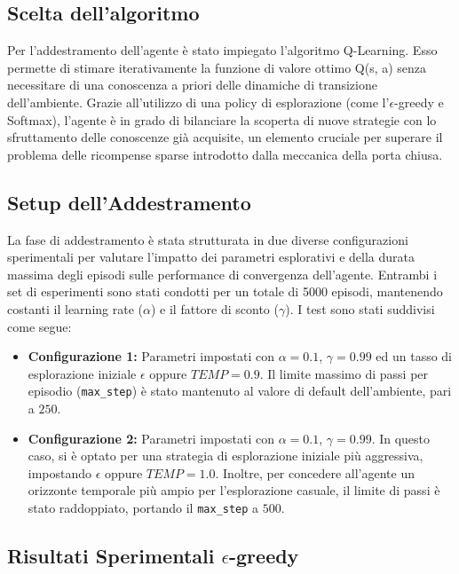\documentclass[12pt,a4paper]{article}
\begin{document}
\subsection{Scelta dell'algoritmo}
Per l’addestramento dell’agente è stato impiegato l’algoritmo Q-Learning. Esso permette di stimare iterativamente la funzione di valore ottimo Q(s, a) senza necessitare di una conoscenza a priori delle dinamiche di transizione dell’ambiente. Grazie all’utilizzo di una policy di esplorazione (come l’$\epsilon$-greedy e Softmax), l’agente è in grado di bilanciare la scoperta di nuove strategie con lo sfruttamento delle conoscenze già acquisite, un elemento cruciale per superare il problema delle ricompense sparse introdotto dalla meccanica della porta chiusa.

\subsection{Setup dell'Addestramento}
La fase di addestramento è stata strutturata in due diverse configurazioni sperimentali per valutare l'impatto dei parametri esplorativi e della durata massima degli episodi sulle performance di convergenza dell'agente. Entrambi i set di esperimenti sono stati condotti per un totale di 5000 episodi, mantenendo costanti il learning rate ($\alpha$) e il fattore di sconto ($\gamma$). I test sono stati suddivisi come segue:

\begin{itemize}
    \item \textbf{Configurazione 1:} Parametri impostati con $\alpha = 0.1$, $\gamma = 0.99$ ed un tasso di esplorazione iniziale $\epsilon$ oppure $TEMP = 0.9$. Il limite massimo di passi per episodio (\texttt{max\_step}) è stato mantenuto al valore di default dell'ambiente, pari a $250$.
    \item \textbf{Configurazione 2:} Parametri impostati con $\alpha = 0.1$, $\gamma = 0.99$. In questo caso, si è optato per una strategia di esplorazione iniziale più aggressiva, impostando $\epsilon$ oppure $TEMP= 1.0$. Inoltre, per concedere all'agente un orizzonte temporale più ampio per l'esplorazione casuale, il limite di passi è stato raddoppiato, portando il \texttt{max\_step} a $500$.
\end{itemize}

\subsection{Risultati Sperimentali $\epsilon$-greedy}
\label{cap:epsilon}
\end{document}
